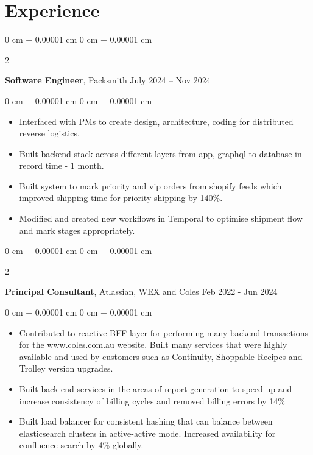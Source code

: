 \documentclass[10pt, letterpaper]{article}
\newenvironment{highlights}{
    \begin{itemize}[
        topsep=0.10 cm,
        parsep=0.10 cm,
        partopsep=0pt,
        itemsep=0pt,
        leftmargin=0 cm + 10pt
    ]
}{
    \end{itemize}
} %
\newenvironment{onecolentry}{
    \begin{adjustwidth}{
        0 cm + 0.00001 cm
    }{
        0 cm + 0.00001 cm
    }
}{
    \end{adjustwidth}
} %
\newenvironment{twocolentry}[2][]{
    \onecolentry
    \def\secondColumn{#2}
    \setcolumnwidth{\fill, 4.5 cm}
    \begin{paracol}{2}
}{
    \switchcolumn \raggedleft \secondColumn
    \end{paracol}
    \endonecolentry
} %
\begin{document}
    \section{Experience}
        \vspace{0.15 cm}
        \begin{twocolentry}{
            July 2024 – Nov 2024
        }
            \textbf{Software Engineer}, Packsmith\end{twocolentry}

        \vspace{0.10 cm}
        \begin{onecolentry}
            \begin{highlights}
                \item Interfaced with PMs to create design, architecture, coding for distributed reverse logistics.
                \item Built backend stack across different layers from app, graphql to database in record time - 1 month.
                \item Built system to mark priority and vip orders from shopify feeds which improved shipping time for priority shipping by 140\%.
                \item Modified and created new workflows in Temporal to optimise shipment flow and mark stages appropriately.
            \end{highlights}
        \end{onecolentry}
        
        \vspace{0.15 cm}
        
        \begin{twocolentry}{
            Feb 2022 - Jun 2024
        }
        \textbf{Principal Consultant}, Atlassian, WEX and Coles\end{twocolentry}

        \vspace{0.10 cm}
        \begin{onecolentry}
            \begin{highlights}
                \item Contributed to reactive BFF layer for performing many backend transactions for the www.coles.com.au website. Built many services that were highly available and used by customers such as Continuity, Shoppable Recipes and Trolley version upgrades.
                \item Built back end services in the areas of report generation to speed up and increase consistency of billing cycles and removed billing errors by 14\%
                \item Built load balancer for consistent hashing that can balance between elasticsearch clusters in active-active mode. Increased availability for confluence search by 4\% globally.
            \end{highlights}
        \end{onecolentry}
\end{document}
